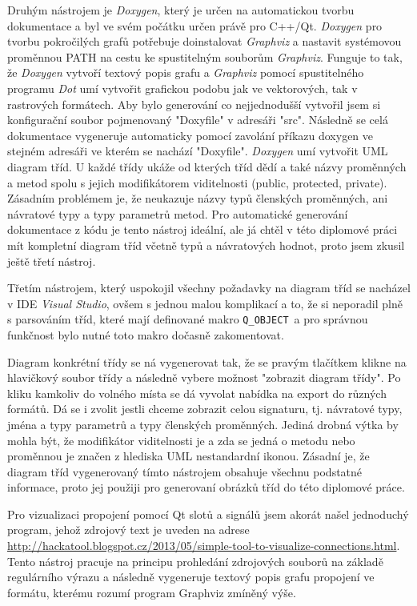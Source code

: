 Druhým nástrojem je \textit{Doxygen}, který je určen na automatickou tvorbu dokumentace a byl ve svém počátku určen právě pro C++/Qt. \textit{Doxygen} pro tvorbu pokročilých grafů potřebuje doinstalovat \textit{Graphviz} a nastavit systémovou proměnnou PATH na cestu ke spustitelným souborům \textit{Graphviz}. Funguje to tak, že \textit{Doxygen} vytvoří textový popis grafu a \textit{Graphviz} pomocí spustitelného programu \textit{Dot} umí vytvořit grafickou podobu jak ve vektorových, tak v rastrových formátech. Aby bylo generování co nejjednodušší vytvořil jsem si konfigurační soubor pojmenovaný "Doxyfile" v adresáři "src". Následně se celá dokumentace vygeneruje automaticky pomocí zavolání příkazu doxygen ve stejném adresáři ve kterém se nachází "Doxyfile". \textit{Doxygen} umí vytvořit UML diagram tříd. U každé třídy ukáže od kterých tříd dědí a také názvy proměnných a metod spolu s jejich modifikátorem viditelnosti (public, protected, private). Zásadním problémem je, že neukazuje názvy typů členských proměnných, ani návratové typy a typy parametrů metod. 
Pro automatické generování dokumentace z kódu je tento nástroj ideální, ale já chtěl v této diplomové práci mít kompletní diagram tříd včetně typů a návratových hodnot, proto jsem zkusil ještě třetí nástroj.


Třetím nástrojem, který uspokojil všechny požadavky na diagram tříd se nacházel v IDE \textit{Visual Studio}, ovšem s jednou malou komplikací a to, že si neporadil plně s parsováním tříd, které mají definované makro \texttt{Q\_OBJECT}\ a pro správnou funkčnost bylo nutné toto makro dočasně zakomentovat. 

Diagram konkrétní třídy se ná vygenerovat tak, že se pravým tlačítkem klikne na hlavičkový soubor třídy a následně vybere možnost "zobrazit diagram třídy". Po kliku kamkoliv do volného místa se dá vyvolat nabídka na export do různých formátů. Dá se i zvolit jestli chceme zobrazit celou signaturu, tj. návratové typy, jména a typy parametrů a typy členských proměnných. Jediná drobná výtka by mohla být, že modifikátor viditelnosti je a zda se jedná o metodu nebo proměnnou je značen z hlediska UML nestandardní ikonou. Zásadní je, že diagram tříd vygenerovaný tímto nástrojem obsahuje všechnu podstatné informace, proto jej použiji pro generovaní obrázků tříd do této diplomové práce.



Pro vizualizaci propojení pomocí Qt slotů a signálů jsem akorát našel jednoduchý program, jehož zdrojový text je uveden na adrese \url{http://hackatool.blogspot.cz/2013/05/simple-tool-to-visualize-connections.html}. Tento nástroj pracuje na principu prohledání zdrojových souborů na základě regulárního výrazu a následně vygeneruje textový popis grafu propojení ve formátu, kterému rozumí program Graphviz zmíněný výše. 
